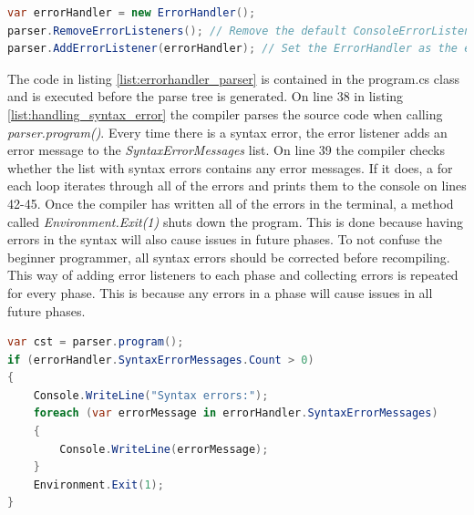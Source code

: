 \begin{lstlisting}[language = csharp, firstnumber=33, label={list:errorhandler_parser},caption= Editing the ErrorHandler on the parser - CobraCompiler/Program.cs]
var errorHandler = new ErrorHandler();
parser.RemoveErrorListeners(); // Remove the default ConsoleErrorListener
parser.AddErrorListener(errorHandler); // Set the ErrorHandler as the error listener
\end{lstlisting}

\noindent
The code in listing \ref{list:errorhandler_parser} is contained in the program.cs class and is executed before the parse tree is generated. On line 38 in listing \ref{list:handling_syntax_error} the compiler parses the source code when calling \textit{parser.program()}. Every time there is a syntax error, the error listener adds an error message to the \textit{SyntaxErrorMessages} list. On line 39 the compiler checks whether the list with syntax errors contains any error messages. If it does, a for each loop iterates through all of the errors and prints them to the console on lines 42-45. Once the compiler has written all of the errors in the terminal, a method called \textit{Environment.Exit(1)}  shuts down the program. This is done because having errors in the syntax will also cause issues in future phases. To not confuse the beginner programmer, all syntax errors should be corrected before recompiling. This way of adding error listeners to each phase and collecting errors is repeated for every phase. This is because any errors in a phase will cause issues in all future phases.

\begin{lstlisting}[language = csharp, firstnumber=38, label={list:handling_syntax_error},caption=Handling syntax errors - CobraCompiler/Program.cs]
var cst = parser.program();
if (errorHandler.SyntaxErrorMessages.Count > 0)
{
    Console.WriteLine("Syntax errors:");
    foreach (var errorMessage in errorHandler.SyntaxErrorMessages)
    {
        Console.WriteLine(errorMessage);
    }
    Environment.Exit(1);
}
\end{lstlisting}


